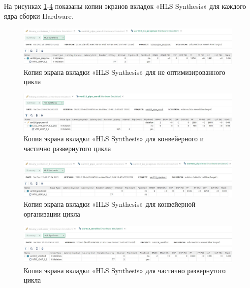 На рисунках \ref{img:hls1}-\ref{img:hls4} показаны копии экранов вкладок «HLS Synthesis» для каждого ядра сборки Hardware.

\begin{figure}[H]
	\begin{center}
		\includegraphics[scale=0.3]{img/hls1.png}
	\end{center}
	\captionsetup{justification=centering}
	\caption{Копия экрана вкладки «HLS Synthesis» для не оптимизированного цикла}
	\label{img:hls1}
\end{figure}

\begin{figure}[H]
	\begin{center}
		\includegraphics[scale=0.3]{img/hls2.png}
	\end{center}
	\captionsetup{justification=centering}
	\caption{Копия экрана вкладки «HLS Synthesis» для конвейерного и частично развернутого цикла}
	\label{img:hls2}
\end{figure}

\begin{figure}[H]
	\begin{center}
		\includegraphics[scale=0.3]{img/hls3.png}
	\end{center}
	\captionsetup{justification=centering}
	\caption{Копия экрана вкладки «HLS Synthesis» для конвейерной организации цикла}
	\label{img:hls3}
\end{figure}

\begin{figure}[H]
	\begin{center}
		\includegraphics[scale=0.3]{img/hls4.png}
	\end{center}
	\captionsetup{justification=centering}
	\caption{Копия экрана вкладки «HLS Synthesis» для частично развернутого цикла}
	\label{img:hls4}
\end{figure}

